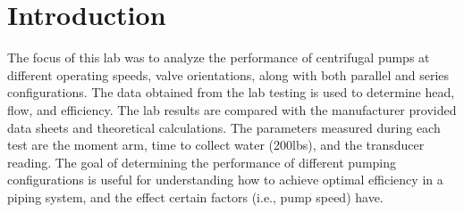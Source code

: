 \section{Introduction}
The focus of this lab was to analyze the performance of centrifugal pumps at different operating speeds, valve orientations, along with both parallel and series configurations. The data obtained from the lab testing is used to determine head, flow, and efficiency. The lab results are compared with the manufacturer provided data sheets and theoretical calculations. The parameters measured during each test are the moment arm, time to collect water (200lbs), and the transducer reading. The goal of determining the performance of different pumping configurations is useful for understanding how to achieve optimal efficiency in a piping system, and the effect certain factors (i.e., pump speed) have.